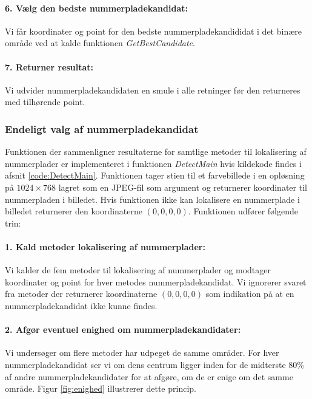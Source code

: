 \paragraph{6. Vælg den bedste nummerpladekandidat:}
Vi får koordinater og point for den bedste nummerpladekandididat i det binære område ved at kalde funktionen \textit{GetBestCandidate}. 

\paragraph{7. Returner resultat:}
Vi udvider nummerpladekandidaten en smule i alle retninger før den returneres med tilhørende point.

\subsubsection{Endeligt valg af nummerpladekandidat}
Funktionen der sammenligner resultaterne for samtlige metoder til lokalisering af nummerplader er implementeret i funktionen \textit{DetectMain} hvis kildekode findes i afsnit \vref{code:DetectMain}. Funktionen tager stien til et farvebillede i en opløsning på $1024 \times 768$ lagret som en JPEG-fil som argument og returnerer koordinater til nummerpladen i billedet. Hvis funktionen ikke kan lokalisere en nummerplade i billedet returnerer den koordinaterne $(0,0,0,0)$. Funktionen udfører følgende trin: 

\paragraph{1. Kald metoder lokalisering af nummerplader:}
Vi kalder de fem metoder til lokalisering af nummerplader og modtager koordinater og point for hver metodes nummerpladekandidat. Vi ignorerer svaret fra metoder der returnerer koordinaterne $(0,0,0,0)$ som indikation på at en nummerpladekandidat ikke kunne findes.

\paragraph{2. Afgør eventuel enighed om nummerpladekandidater:}
Vi undersøger om flere metoder har udpeget de samme områder. For hver nummerpladekandidat ser vi om dens centrum ligger inden for de midterste 80\% af andre nummerpladekandidater for at afgøre, om de er enige om det samme område. Figur \vref{fig:enighed} illustrerer dette princip.

